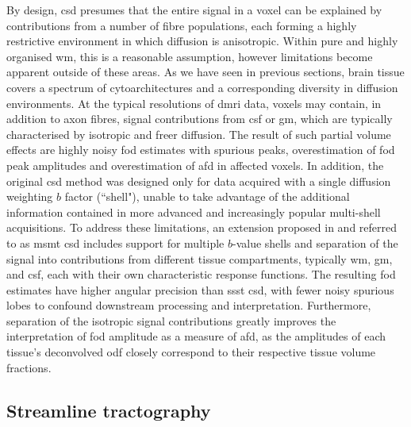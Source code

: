 By design, \gls{csd} presumes that the entire signal in a voxel can be explained by contributions from a number of fibre populations, each forming a highly restrictive environment in which diffusion is anisotropic.
Within pure and highly organised \gls{wm}, this is a reasonable assumption, however limitations become apparent outside of these areas.
As we have seen in previous sections, brain tissue covers a spectrum of cytoarchitectures and a corresponding diversity in diffusion environments.
At the typical resolutions of \gls{dmri} data, voxels may contain, in addition to axon fibres, signal contributions from \gls{csf} or \gls{gm}, which are typically characterised by isotropic and freer diffusion.
The result of such partial volume effects are highly noisy \gls{fod} estimates with spurious peaks, overestimation of \gls{fod} peak amplitudes and overestimation of \gls{afd} in affected voxels.\autocite{Jeurissen2014}
In addition, the original \gls{csd} method was designed only for data acquired with a single diffusion weighting $b$ factor (``shell"), unable to take advantage of the additional information contained in more advanced and increasingly popular multi-shell acquisitions.
To address these limitations, an extension proposed in \textcite{Jeurissen2014} and referred to as \gls{msmt} \gls{csd} includes support for multiple $b$-value shells and separation of the signal into contributions from different tissue compartments, typically \gls{wm}, \gls{gm}, and \gls{csf}, each with their own characteristic response functions.
The resulting \gls{fod} estimates have higher angular precision than \gls{ssst} \gls{csd}, with fewer noisy spurious lobes to confound downstream processing and interpretation.
Furthermore, separation of the isotropic signal contributions greatly improves the interpretation of \gls{fod} amplitude as a measure of \gls{afd}, as the amplitudes of each tissue's deconvolved \gls{odf} closely correspond to their respective tissue volume fractions\autocite{Jeurissen2014}.

\subsection{Streamline tractography}\label{sec:tractography}


